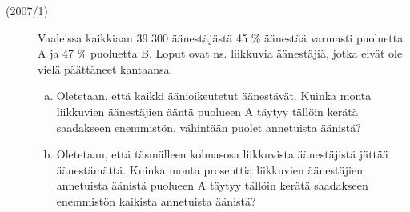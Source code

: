 \begin{description}
	\item[(2007/1)] Vaaleissa kaikkiaan 39 300 äänestäjästä 45 \% äänestää varmasti puoluetta A ja 47 \% puoluetta B. Loput ovat ns. liikkuvia äänestäjiä, jotka eivät ole vielä päättäneet kantaansa.
	
	\begin{enumerate}[(a)]
		\item Oletetaan, että kaikki äänioikeutetut äänestävät. Kuinka monta liikkuvien äänestäjien ääntä puolueen A täytyy tällöin kerätä saadakseen enemmistön, vähintään puolet annetuista äänistä?
		\item Oletetaan, että täsmälleen kolmasosa liikkuvista äänestäjistä jättää äänestämättä. Kuinka monta prosenttia liikkuvien äänestäjien annetuista äänistä puolueen A täytyy tällöin kerätä saadakseen enemmistön kaikista annetuista äänistä?
	\end{enumerate}	 	
	
\end{description}

